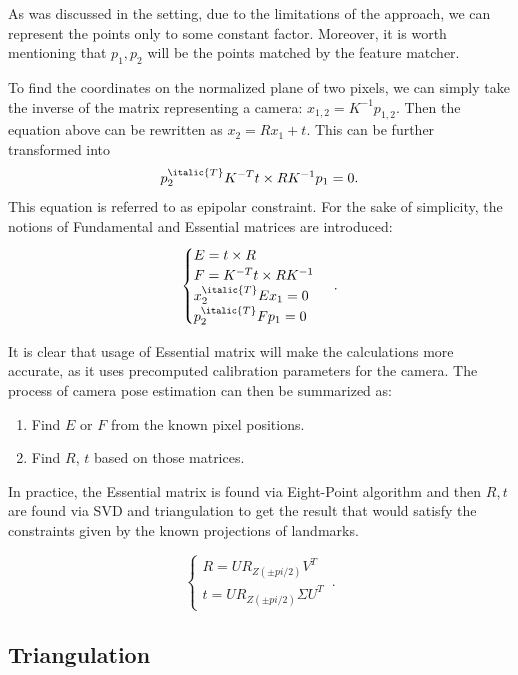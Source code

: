 As was discussed in the setting, due to the limitations of the approach, we can represent the points only to some constant factor. Moreover, it is worth mentioning that $p_{1}, p_{2}$ will be the points matched by the feature matcher.

To find the coordinates on the normalized plane of two pixels, we can simply take the inverse of the matrix representing a camera:
$x_{1, 2} = K^{-1}p_{1, 2}.$ Then the equation above can be rewritten as $x_{2} = Rx_{1} + t.$ This can be further transformed into $$p_{2}^{\italic{T}} K^{-T} t \times R K^{-1} p_{1} = 0.$$ This equation is referred to as epipolar constraint. For the sake of simplicity, the notions of Fundamental and Essential matrices are introduced:
\begin{equation}
    \begin{cases}
      E = t \times R\\
      F = K^{-T} t \times R K^{-1}\\
      x_{2}^{\italic{T}} E x_{1} = 0\\
      p_{2}^{\italic{T}} F p_{1} = 0
    \end{cases}\,.
\end{equation}

It is clear that usage of Essential matrix will make the calculations more accurate, as it uses precomputed calibration parameters for the camera. 
The process of camera pose estimation can then be summarized as:
\begin{enumerate}
    \item Find $E$ or $F$ from the known pixel positions.
    \item Find $R$, $t$ based on those matrices.
\end{enumerate}

In practice, the Essential matrix is found via Eight-Point algorithm and then $R, t$ are found via SVD and triangulation to get the result that would satisfy the constraints given by the known projections of landmarks.

\begin{equation}
    \begin{cases}
        R = U R_{Z(\pm pi/2)} V^{T}\\
        t = U R_{Z(\pm pi/2)} \Sigma U^{T}
    \end{cases}\,.
\end{equation}


\subsection{Triangulation}

